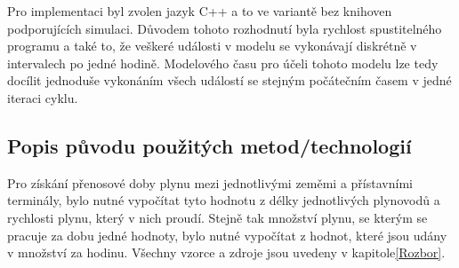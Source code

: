 \documentclass[a4paper,11pt]{article}
\begin{document}


Pro implementaci byl zvolen jazyk C++ a to ve variantě bez knihoven podporujících simulaci.
Důvodem tohoto rozhodnutí byla rychlost spustitelného programu a také to,
že veškeré události v modelu se vykonávají diskrétně v intervalech po jedné hodině.
Modelového času \cite[str,21]{IMS} pro účeli tohoto modelu lze tedy docílit
jednoduše vykonáním všech
událostí se stejným počátečním časem v jedné iteraci cyklu.



\subsection{Popis původu použitých metod/technologií}


Pro získání přenosové doby plynu mezi jednotlivými zeměmi a přístavními terminály,
bylo nutné vypočítat tyto hodnotu z délky jednotlivých plynovodů a rychlosti plynu,
který v nich proudí.
Stejně tak množství plynu, se kterým se pracuje za dobu jedné hodnoty,
bylo nutné vypočítat z hodnot, které jsou udány v množství za hodinu.
Všechny vzorce a zdroje jsou uvedeny v kapitole\ref{Rozbor}. 
\end{document}
